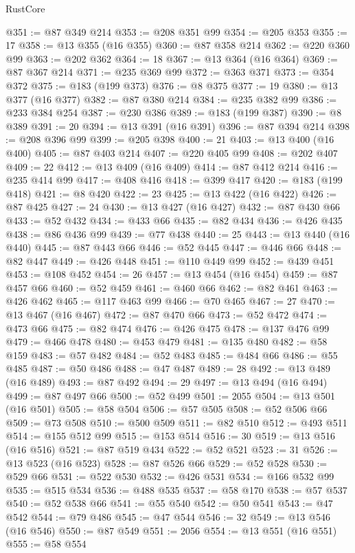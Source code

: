 \begin{lexlean}{RustCore}
\begin{coremodule}
@351 := @87 @349 @214
@353 := @208 @351 @99
@354 := @205 @353
@355 := 17
@358 := @13 @355 (@16 @355)
@360 := @87 @358 @214
@362 := @220 @360 @99
@363 := @202 @362
@364 := 18
@367 := @13 @364 (@16 @364)
@369 := @87 @367 @214
@371 := @235 @369 @99
@372 := @363 @371
@373 := @354 @372
@375 := @183 (@199 @373)
@376 := @8 @375
@377 := 19
@380 := @13 @377 (@16 @377)
@382 := @87 @380 @214
@384 := @235 @382 @99
@386 := @233 @384 @254
@387 := @230 @386
@389 := @183 (@199 @387)
@390 := @8 @389
@391 := 20
@394 := @13 @391 (@16 @391)
@396 := @87 @394 @214
@398 := @208 @396 @99
@399 := @205 @398
@400 := 21
@403 := @13 @400 (@16 @400)
@405 := @87 @403 @214
@407 := @220 @405 @99
@408 := @202 @407
@409 := 22
@412 := @13 @409 (@16 @409)
@414 := @87 @412 @214
@416 := @235 @414 @99
@417 := @408 @416
@418 := @399 @417
@420 := @183 (@199 @418)
@421 := @8 @420
@422 := 23
@425 := @13 @422 (@16 @422)
@426 := @87 @425
@427 := 24
@430 := @13 @427 (@16 @427)
@432 := @87 @430 @66
@433 := @52 @432
@434 := @433 @66
@435 := @82 @434
@436 := @426 @435
@438 := @86 @436 @99
@439 := @77 @438
@440 := 25
@443 := @13 @440 (@16 @440)
@445 := @87 @443 @66
@446 := @52 @445
@447 := @446 @66
@448 := @82 @447
@449 := @426 @448
@451 := @110 @449 @99
@452 := @439 @451
@453 := @108 @452
@454 := 26
@457 := @13 @454 (@16 @454)
@459 := @87 @457 @66
@460 := @52 @459
@461 := @460 @66
@462 := @82 @461
@463 := @426 @462
@465 := @117 @463 @99
@466 := @70 @465
@467 := 27
@470 := @13 @467 (@16 @467)
@472 := @87 @470 @66
@473 := @52 @472
@474 := @473 @66
@475 := @82 @474
@476 := @426 @475
@478 := @137 @476 @99
@479 := @466 @478
@480 := @453 @479
@481 := @135 @480
@482 := @58 @159
@483 := @57 @482
@484 := @52 @483
@485 := @484 @66
@486 := @55 @485
@487 := @50 @486
@488 := @47 @487
@489 := 28
@492 := @13 @489 (@16 @489)
@493 := @87 @492
@494 := 29
@497 := @13 @494 (@16 @494)
@499 := @87 @497 @66
@500 := @52 @499
@501 := 2055
@504 := @13 @501 (@16 @501)
@505 := @58 @504
@506 := @57 @505
@508 := @52 @506 @66
@509 := @73 @508
@510 := @500 @509
@511 := @82 @510
@512 := @493 @511
@514 := @155 @512 @99
@515 := @153 @514
@516 := 30
@519 := @13 @516 (@16 @516)
@521 := @87 @519 @434
@522 := @52 @521
@523 := 31
@526 := @13 @523 (@16 @523)
@528 := @87 @526 @66
@529 := @52 @528
@530 := @529 @66
@531 := @522 @530
@532 := @426 @531
@534 := @166 @532 @99
@535 := @515 @534
@536 := @488 @535
@537 := @58 @170
@538 := @57 @537
@540 := @52 @538 @66
@541 := @55 @540
@542 := @50 @541
@543 := @47 @542
@544 := @79 @486
@545 := @47 @544
@546 := 32
@549 := @13 @546 (@16 @546)
@550 := @87 @549
@551 := 2056
@554 := @13 @551 (@16 @551)
@555 := @58 @554

\end{coremodule}
\end{lexlean}
